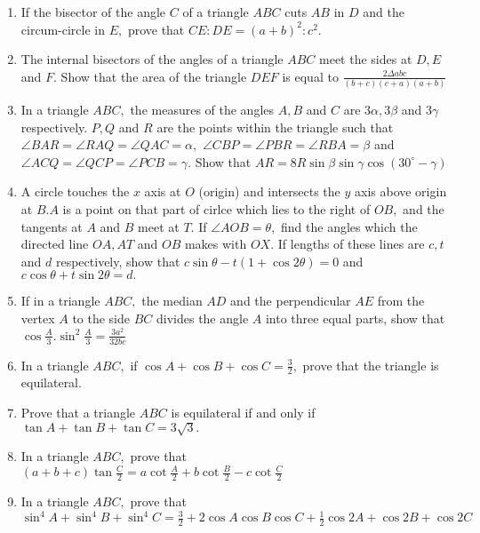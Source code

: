 \begin{enumerate}
\item If the bisector of the angle $C$ of a triangle $ABC$ cuts $AB$ in $D$ and the circum-circle in
     $E,$ prove that $CE:DE = (a + b)^2:c^2.$

\item The internal bisectors of the angles of a triangle $ABC$ meet the sides at $D, E$ and $F.$ Show that the
     area of the triangle $DEF$ is equal to $\frac{2\Delta abc}{(b + c)(c + a)(a + b)}$

\item In a triangle $ABC,$ the measures of the angles $A, B$ and $C$ are $3\alpha, 3\beta$ and
     $3\gamma$ respectively. $P, Q$ and $R$ are the points within the triangle such that $\angle BAR =
     \angle RAQ = \angle QAC = \alpha,$ $\angle CBP = \angle PBR = \angle RBA = \beta$ and $\angle ACQ = \angle QCP =
     \angle PCB = \gamma.$ Show that $AR = 8R\sin\beta\sin\gamma\cos(30^\circ - \gamma)$

\item A circle touches the $x$ axis at $O$ (origin) and intersects the $y$ axis above origin at $B. A$ is a
     point on that part of cirlce which lies to the  right of $OB,$ and the tangents at $A$ and $B$ meet at
     $T.$ If $\angle AOB = \theta,$ find the angles which the directed line $OA, AT$ and $OB$ makes with
     $OX.$ If lengths of these lines are $c, t$ and $d$ respectively, show that $c\sin\theta - t(1 +
     \cos2\theta) = 0$ and $c\cos\theta + t\sin2\theta = d.$

\item If in a triangle $ABC,$ the median $AD$ and the perpendicular $AE$ from the vertex $A$ to the side
     $BC$ divides the angle $A$ into three equal parts, show that $\cos\frac{A}{3}.\sin^2\frac{A}{3} =
     \frac{3a^2}{32bc}$

\item In a triangle $ABC,$ if $\cos A + \cos B + \cos C = \frac{3}{2},$ prove that the triangle is equilateral.

\item Prove that a triangle $ABC$ is equilateral if and only if $\tan A + \tan B + \tan C = 3\sqrt{3}.$

\item In a triangle $ABC,$ prove that $(a + b + c)\tan\frac{C}{2} = a\cot\frac{A}{2} + b\cot\frac{B}{2} -
     c\cot\frac{C}{2}$

\item In a triangle $ABC,$ prove that $\sin^4A + \sin^4B + \sin^4C = \frac{3}{2} + 2\cos A\cos B\cos C + \frac{1}{2}\cos
     2A + \cos 2B + \cos 2C$


\end{enumerate}
